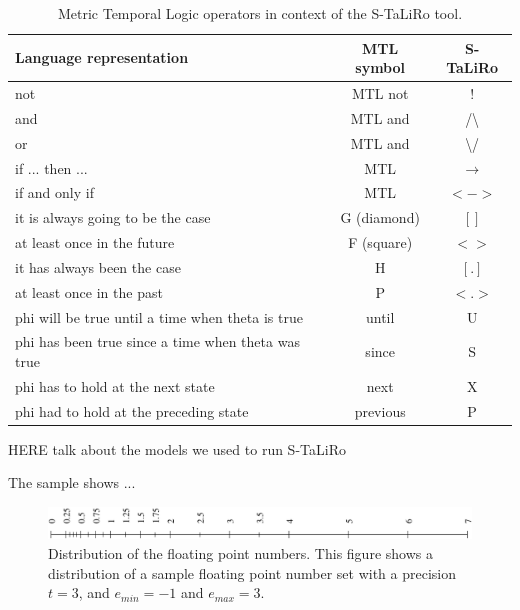 \begin{table}[htb]
\begin{center}
\begin{tabular}{|p{9cm}|c|c|}
	\hline
	Language representation & MTL symbol & S-TaLiRo\\
	\hline
	not & MTL not & $!$ \\
	\hline	
	and & MTL and & /\textbackslash \\
	\hline
	or & MTL and & \textbackslash/ \\
	\hline
	if ... then ... & MTL &$\rightarrow$ \\
	\hline
	if and only if & MTL & $<->$ \\
	\hline
	it is always going to be the case & G (diamond) & $[ ]$ \\
	\hline
	at least once in the future & F (square) & $< >$ \\
	\hline
	it has always been the case & H & $[ . ]$ \\
	\hline
	at least once in the past & P & $< . >$ \\
	\hline
	phi will be true until a time when theta is true & until & U \\
	\hline
	phi has been true since a time when theta was true & since & S \\
	\hline
	phi has to hold at the next state & next & X \\
	\hline
	phi had to hold at the preceding state & previous & P \\
	\hline
\end{tabular}
\end{center}
\caption{Metric Temporal Logic operators in context of the S-TaLiRo tool.}
\label{tab.MTLsTaLiRo}
\end{table}

HERE talk about the models we used to run S-TaLiRo


The sample  shows ...

\begin{figure}[htb]
\begin{center}
\includegraphics[width=.95\textwidth]{pic/float.pdf}
\end{center}
\caption{Distribution of the floating point numbers. This figure shows a distribution of a sample floating point number set with a precision $t=3$, and $e_{min}=-1$ and $e_{max}=3$.}
\label{fig.float}
\end{figure}


